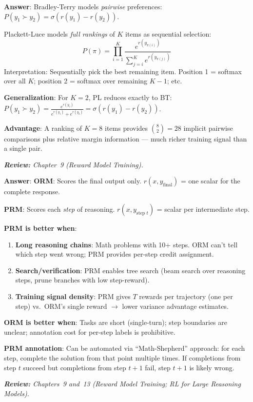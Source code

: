 \begin{questionbox}
\textbf{Answer}: Bradley-Terry models \emph{pairwise} preferences: $P(y_1 \succ y_2) = \sigma(r(y_1) - r(y_2))$.

Plackett-Luce models \emph{full rankings} of $K$ items as sequential selection: 
\[
P(\pi) = \prod_{i=1}^K \frac{e^{r(y_{\pi(i)})}}{\sum_{j=i}^K e^{r(y_{\pi(j)})}}
\]
 Interpretation: Sequentially pick the best remaining item. Position 1 = softmax over all $K$; position 2 = softmax over remaining $K-1$; etc.

\textbf{Generalization}: For $K=2$, PL reduces exactly to BT: $P(y_1 \succ y_2) = \frac{e^{r(y_1)}}{e^{r(y_1)} + e^{r(y_2)}} = \sigma(r(y_1) - r(y_2))$.

\textbf{Advantage}: A ranking of $K=8$ items provides $\binom{8}{2} = 28$ implicit pairwise comparisons plus relative margin information --- much richer training signal than a single pair.

\emph{\textbf{Review:} Chapter~9 (Reward Model Training).}
\end{questionbox}

\begin{questionbox}
\textbf{Answer}: \textbf{ORM}: Scores the final output only. $r(x, y_{\text{final}})$ = one scalar for the complete response.

\textbf{PRM}: Scores each \emph{step} of reasoning. $r(x, y_{\text{step } t})$ = scalar per intermediate step.

\textbf{PRM is better when}:

\begin{enumerate}
  \item \textbf{Long reasoning chains}: Math problems with 10+ steps. ORM can’t tell which step went wrong; PRM provides per-step credit assignment.
  \item \textbf{Search/verification}: PRM enables tree search (beam search over reasoning steps, prune branches with low step-reward).
  \item \textbf{Training signal density}: PRM gives $T$ rewards per trajectory (one per step) vs.~ORM’s single reward $\to$ lower variance advantage estimates.
\end{enumerate}

\textbf{ORM is better when}: Tasks are short (single-turn); step boundaries are unclear; annotation cost for per-step labels is prohibitive.

\textbf{PRM annotation}: Can be automated via ``Math-Shepherd'' approach: for each step, complete the solution from that point multiple times. If completions from step $t$ succeed but completions from step $t+1$ fail, step $t+1$ is likely wrong.

\emph{\textbf{Review:} Chapters~9 and~13 (Reward Model Training; RL for Large Reasoning Models).}
\end{questionbox}


